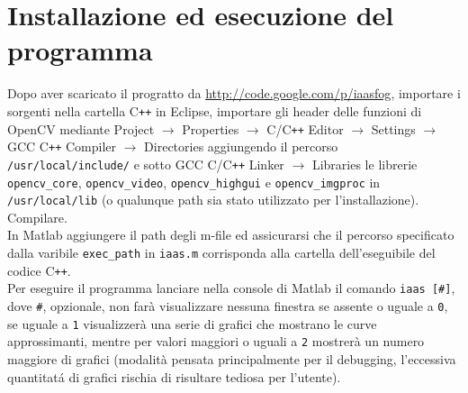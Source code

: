 \documentclass[12pt]{report}
\begin{document}
\section{Installazione ed esecuzione del programma}

\noindent Dopo aver scaricato il progratto da \url{http://code.google.com/p/iaasfog}, importare i sorgenti nella cartella C\verb|++| in Eclipse, importare gli header delle funzioni di OpenCV mediante Project $\rightarrow$ Properties  $\rightarrow$ C\slash C\verb|++| Editor $\rightarrow$ Settings $\rightarrow$ GCC C\verb|++| Compiler $\rightarrow$ Directories aggiungendo il percorso \verb|/usr/local/include/| e sotto GCC C\slash C\verb|++| Linker $\rightarrow$ Libraries le librerie \verb|opencv_core|, \verb|opencv_video|, \verb|opencv_highgui| e \verb|opencv_imgproc| in \verb|/usr/local/lib| (o qualunque path sia stato utilizzato per l'installazione).\\
Compilare.\\

\noindent In Matlab aggiungere il path degli m-file ed assicurarsi che il percorso specificato dalla varibile \verb|exec_path| in \verb|iaas.m| corrisponda alla cartella dell'eseguibile del codice C\verb|++|.\\
Per eseguire il programma lanciare nella console di Matlab il comando \verb|iaas [#]|, dove \verb|#|, opzionale, non far\`a visualizzare nessuna finestra se assente o uguale a \verb|0|, se uguale a \verb|1| visualizzer\`a una serie di grafici che mostrano le curve approssimanti, mentre per valori maggiori o uguali a \verb|2| mostrer\`a un numero maggiore di grafici (modalit\`a pensata principalmente per il debugging, l'eccessiva quantitat\'a di grafici rischia di risultare tediosa per l'utente).

\end{document}
